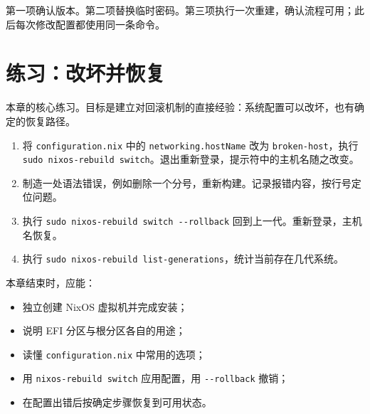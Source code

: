 第一项确认版本。第二项替换临时密码。第三项执行一次重建，确认流程可用；此后每次修改配置都使用同一条命令。

\section{练习：改坏并恢复}

本章的核心练习。目标是建立对回滚机制的直接经验：系统配置可以改坏，也有确定的恢复路径。

\begin{enumerate}
  \item 将 \texttt{configuration.\allowbreak{}nix} 中的 \texttt{networking.\allowbreak{}hostName} 改为 \texttt{broken-host}，执行 \texttt{sudo nixos-\allowbreak{}rebuild switch}。退出重新登录，提示符中的主机名随之改变。
  \item 制造一处语法错误，例如删除一个分号，重新构建。记录报错内容，按行号定位问题。
  \item 执行 \texttt{sudo nixos-rebuild switch -{}-rollback} 回到上一代。重新登录，主机名恢复。
  \item 执行 \texttt{sudo nixos-\allowbreak{}rebuild list-\allowbreak{}generations}，统计当前存在几代系统。
\end{enumerate}

\begin{checkpoint}
本章结束时，应能：
\begin{itemize}
  \item 独立创建 NixOS 虚拟机并完成安装；
  \item 说明 EFI 分区与根分区各自的用途；
  \item 读懂 \texttt{configuration.\allowbreak{}nix} 中常用的选项；
  \item 用 \texttt{nixos-\allowbreak{}rebuild switch} 应用配置，用 \texttt{-{}-rollback} 撤销；
  \item 在配置出错后按确定步骤恢复到可用状态。
\end{itemize}
\end{checkpoint}
